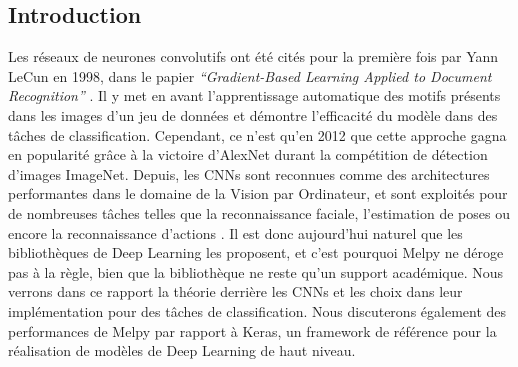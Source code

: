 \begin{multicols}{2}
\tableofcontents
\section{Introduction}
Les réseaux de neurones convolutifs ont été cités pour 
la première fois par Yann LeCun en 1998, dans le papier 
\textit{“Gradient-Based Learning Applied to Document Recognition”} \cite{YannLeCunCNNs}.
Il y met en avant l’apprentissage automatique des motifs présents dans les 
images d’un jeu de données et démontre l’efficacité du modèle dans des tâches
de classification. Cependant, ce n’est qu’en 2012 que cette approche 
gagna en popularité grâce à la victoire d’AlexNet\cite{AlexNet} durant la 
compétition de détection d’images ImageNet. Depuis, les CNNs sont reconnues 
comme des architectures performantes dans le domaine de la Vision par Ordinateur, 
et sont exploités pour de nombreuses tâches telles que la reconnaissance 
faciale, l’estimation de poses ou encore la reconnaissance d’actions 
\cite{ApplicationsOfCNNs}. Il est donc aujourd’hui naturel que les bibliothèques 
de Deep Learning les proposent, et c’est pourquoi Melpy ne déroge pas à la 
règle, bien que la bibliothèque ne reste qu'un support académique. Nous verrons dans 
ce rapport la théorie derrière les CNNs et les choix 
dans leur implémentation pour des tâches de classification. Nous discuterons 
également des performances de Melpy par rapport à Keras, un framework de 
référence pour la réalisation de modèles de Deep Learning de haut niveau.
\end{multicols}